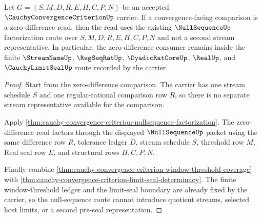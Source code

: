 \begin{theorem}
\label{thm:cauchy-convergence-criterion-null-sequence-scope}
Let $G=(S,M,D,R,E,H,C,P,N)$ be an accepted $\CauchyConvergenceCriterionUp$ carrier. If a convergence-facing comparison is a zero-difference read, then the read uses the existing $\NullSequenceUp$ factorization route over $S,M,D,R,E,H,C,P,N$ and not a second stream representative. In particular, the zero-difference consumer remains inside the finite $\StreamNameUp$, $\RegSeqRatUp$, $\DyadicRatCoreUp$, $\RealUp$, and $\CauchyLimitSealUp$ route recorded by the carrier.
\end{theorem}
\begin{proof}
Start from the zero-difference comparison. The carrier has one stream schedule $S$ and one regular-rational comparison row $R$, so there is no separate stream representative available for the comparison.

Apply \autoref{thm:cauchy-convergence-criterion-nullsequence-factorization}. The zero-difference read factors through the displayed $\NullSequenceUp$ packet using the same difference row $R$, tolerance ledger $D$, stream schedule $S$, threshold row $M$, Real seal row $E$, and structural rows $H,C,P,N$.

Finally combine \autoref{thm:cauchy-convergence-criterion-window-threshold-coverage} with \autoref{thm:cauchy-convergence-criterion-limit-seal-determinacy}. The finite window-threshold ledger and the limit-seal boundary are already fixed by the carrier, so the null-sequence route cannot introduce quotient streams, selected host limits, or a second pre-seal representation.
\end{proof}

